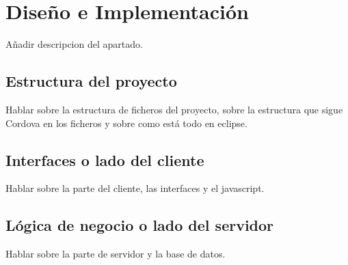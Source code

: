 
\chapter{Diseño e Implementación}
\label{diseno-e-implementacion}

Añadir descripcion del apartado.\\

\section{Estructura del proyecto}
\label{diseno-e-implementacion:estructura}

Hablar sobre la estructura de ficheros del proyecto, sobre la estructura que sigue Cordova en los ficheros y sobre como está todo en eclipse.\\

\section{Interfaces o lado del cliente}
\label{diseno-e-implementacion:interfaces}

Hablar sobre la parte del cliente, las interfaces y el javascript.\\

\section{Lógica de negocio o lado del servidor}
\label{diseno-e-implementacion:logica-negocio}

Hablar sobre la parte de servidor y la base de datos.\\